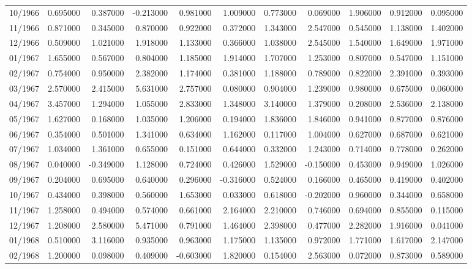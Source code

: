 \begin{tabular}{lrrrrrrrrrr}
10/1966 & 0.695000 & 0.387000 & -0.213000 & 0.981000 & 1.009000 & 0.773000 & 0.069000 & 1.906000 & 0.912000 & 0.095000 \\
11/1966 & 0.871000 & 0.345000 & 0.870000 & 0.922000 & 0.372000 & 1.343000 & 2.547000 & 0.545000 & 1.138000 & 1.402000 \\
12/1966 & 0.509000 & 1.021000 & 1.918000 & 1.133000 & 0.366000 & 1.038000 & 2.545000 & 1.540000 & 1.649000 & 1.971000 \\
01/1967 & 1.655000 & 0.567000 & 0.804000 & 1.185000 & 1.914000 & 1.707000 & 1.253000 & 0.807000 & 0.547000 & 1.151000 \\
02/1967 & 0.754000 & 0.950000 & 2.382000 & 1.174000 & 0.381000 & 1.188000 & 0.789000 & 0.822000 & 2.391000 & 0.393000 \\
03/1967 & 2.570000 & 2.415000 & 5.631000 & 2.757000 & 0.080000 & 0.904000 & 1.239000 & 0.980000 & 0.675000 & 0.060000 \\
04/1967 & 3.457000 & 1.294000 & 1.055000 & 2.833000 & 1.348000 & 3.140000 & 1.379000 & 0.208000 & 2.536000 & 2.138000 \\
05/1967 & 1.627000 & 0.168000 & 1.035000 & 1.206000 & 0.194000 & 1.836000 & 1.846000 & 0.941000 & 0.877000 & 0.876000 \\
06/1967 & 0.354000 & 0.501000 & 1.341000 & 0.634000 & 1.162000 & 0.117000 & 1.004000 & 0.627000 & 0.687000 & 0.621000 \\
07/1967 & 1.034000 & 1.361000 & 0.655000 & 0.151000 & 0.644000 & 0.332000 & 1.243000 & 0.714000 & 0.778000 & 0.262000 \\
08/1967 & 0.040000 & -0.349000 & 1.128000 & 0.724000 & 0.426000 & 1.529000 & -0.150000 & 0.453000 & 0.949000 & 1.026000 \\
09/1967 & 0.204000 & 0.695000 & 0.640000 & 0.296000 & -0.316000 & 0.524000 & 0.166000 & 0.465000 & 0.419000 & 0.402000 \\
10/1967 & 0.434000 & 0.398000 & 0.560000 & 1.653000 & 0.033000 & 0.618000 & -0.202000 & 0.960000 & 0.344000 & 0.658000 \\
11/1967 & 1.258000 & 0.494000 & 0.574000 & 0.661000 & 2.164000 & 2.210000 & 0.746000 & 0.694000 & 0.855000 & 0.115000 \\
12/1967 & 1.208000 & 2.580000 & 5.471000 & 0.791000 & 1.464000 & 2.398000 & 0.477000 & 2.282000 & 1.916000 & 0.041000 \\
01/1968 & 0.510000 & 3.116000 & 0.935000 & 0.963000 & 1.175000 & 1.135000 & 0.972000 & 1.771000 & 1.617000 & 2.147000 \\
02/1968 & 1.200000 & 0.098000 & 0.409000 & -0.603000 & 1.820000 & 0.154000 & 2.563000 & 0.072000 & 0.873000 & 0.589000 \\

\end{tabular}
